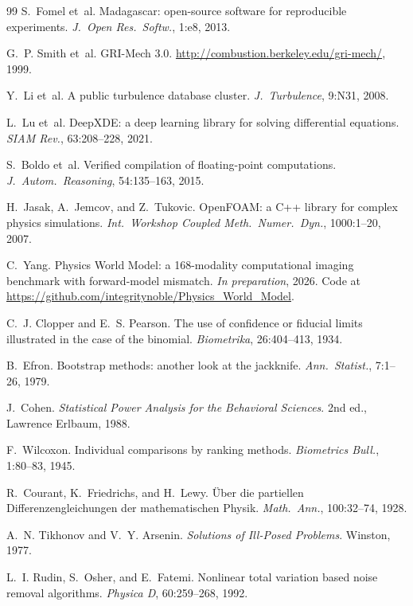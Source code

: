 \documentclass[11pt,a4paper]{article}
\begin{document}
\begin{thebibliography}{99}
S.~Fomel et~al. Madagascar: open-source software for reproducible experiments. \emph{J.\ Open Res.\ Softw.}, 1:e8, 2013.

G.~P. Smith et~al. GRI-Mech 3.0. \url{http://combustion.berkeley.edu/gri-mech/}, 1999.

Y.~Li et~al. A public turbulence database cluster. \emph{J.\ Turbulence}, 9:N31, 2008.

L.~Lu et~al. DeepXDE: a deep learning library for solving differential equations. \emph{SIAM Rev.}, 63:208--228, 2021.

S.~Boldo et~al. Verified compilation of floating-point computations. \emph{J.\ Autom.\ Reasoning}, 54:135--163, 2015.

H.~Jasak, A.~Jemcov, and Z.~Tukovic. OpenFOAM: a C++ library for complex physics simulations. \emph{Int.\ Workshop Coupled Meth.\ Numer.\ Dyn.}, 1000:1--20, 2007.

C.~Yang. Physics World Model: a 168-modality computational imaging benchmark with forward-model mismatch. \emph{In preparation}, 2026. Code at \url{https://github.com/integritynoble/Physics_World_Model}.


C.~J. Clopper and E.~S. Pearson. The use of confidence or fiducial limits illustrated in the case of the binomial. \emph{Biometrika}, 26:404--413, 1934.

B.~Efron. Bootstrap methods: another look at the jackknife. \emph{Ann.\ Statist.}, 7:1--26, 1979.

J.~Cohen. \emph{Statistical Power Analysis for the Behavioral Sciences}. 2nd ed., Lawrence Erlbaum, 1988.

F.~Wilcoxon. Individual comparisons by ranking methods. \emph{Biometrics Bull.}, 1:80--83, 1945.


R.~Courant, K.~Friedrichs, and H.~Lewy. {\"U}ber die partiellen Differenzengleichungen der mathematischen Physik. \emph{Math.\ Ann.}, 100:32--74, 1928.

A.~N. Tikhonov and V.~Y. Arsenin. \emph{Solutions of Ill-Posed Problems}. Winston, 1977.

L.~I. Rudin, S.~Osher, and E.~Fatemi. Nonlinear total variation based noise removal algorithms. \emph{Physica D}, 60:259--268, 1992.


\end{thebibliography}
\end{document}
